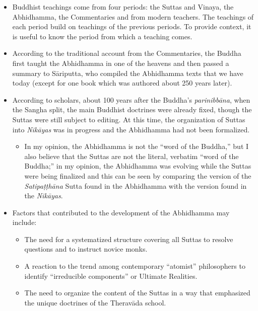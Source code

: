 \begin{itemize}

\item Buddhist teachings come from four periods: the Suttas and Vinaya, the Abhidhamma, the Commentaries and from modern teachers. The teachings of each period build on teachings of the previous periods. To provide context, it is useful to know the period from which a teaching comes.

\item According to the traditional account from the Commentaries, the Buddha first taught the Abhidhamma in one of the heavens and then passed a summary to Sāriputta, who compiled the Abhidhamma texts that we have today (except for one book which was authored about 250 years later).

\item According to scholars, about 100 years after the Buddha’s \textit{parinibbāna}, when the Sangha split, the main Buddhist doctrines were already fixed, though the Suttas were still subject to editing. At this time, the organization of Suttas into \textit{Nikāyas} was in progress and the Abhidhamma had not been formalized.

\begin{itemize}

\item In my opinion, the Abhidhamma is not the “word of the Buddha,” but I also believe that the Suttas are not the  literal, verbatim “word of the Buddha;” in my opinion, the Abhidhamma was evolving while the Suttas were being finalized and this can be seen by comparing the version of the \textit{Satipaṭṭhāna} Sutta found in the Abhidhamma with the version found in the \textit{Nikāyas}.

\end{itemize}

\item Factors that contributed to the development of the Abhidhamma may include:

\begin{itemize}

\item The need for a systematized structure covering all Suttas to resolve questions and to instruct novice monks.

\item A reaction to the trend among contemporary “atomist” philosophers to identify “irreducible components” or Ultimate Realities.

\item The need to organize the content of the Suttas in a way that emphasized the unique doctrines of the Theravāda school.


\end{itemize}
\end{itemize}
